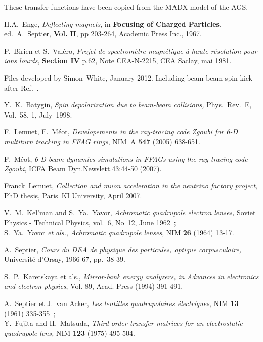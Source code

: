 \begin{thebibliography}{99}
 These transfer functions have been copied from the MADX model of the AGS.

H.A.~Enge, 
\textsl{Deflecting magnets}, in \textbf{Focusing of Charged Particles}, 
ed.~A.~Septier, \textbf{Vol.}  \textbf{II}, pp 203-264, Academic
Press Inc., 1967.

P.~Birien et S.~Val\'ero, 
\textsl{Projet de spectrom\`etre magn\'etique \`a haute r\'esolution pour ions lourds}, 
\textbf{Section IV} p.62, Note CEA-N-2215, CEA Saclay, mai 1981.


 Files developed by Simon~White, January 2012. Including beam-beam spin kick after Ref.~\cite{YKBatyginSpin}. 

Y.~K.~Batygin, 
\textsl{Spin depolarization due to beam-beam collisions, } 
Phys.~Rev.~E, Vol.~58,  1, July~1998. 

F.~Lemuet, F.~M\'eot, 
\textsl{Developements in the ray-tracing code Zgoubi for 6-D multiturn tracking in FFAG rings}, 
NIM~A \textbf{547} (2005) 638-651. 

 F.~M\'eot,  
\textsl{6-D beam dynamics simulations in FFAGs using the ray-tracing code Zgoubi}, 
ICFA Beam Dyn.Newslett.43:44-50 (2007).

Franck~Lemuet, 
\textsl{Collection and muon acceleration in the neutrino factory project}, 
PhD thesis, Paris~KI University, April 2007. 

V.~M.~Kel'man and S.~Ya.~Yavor, 
\textsl{Achromatic quadrupole electron lenses, } 
Soviet Physics - Technical Physics, vol.~6, No~12, June 1962~; \\
S.~Ya.~Yavor \textsl{et als.}, 
\textsl{Achromatic quadrupole lenses}, 
NIM \textbf{26} (1964) 13-17. 

A.~Septier, 
\textsl{Cours du DEA de physique des particules, optique corpusculaire,}  
Universit\'e d'Orsay, 1966-67, pp.~38-39.  

S.~P.~Karetskaya et als., 
\textsl{Mirror-bank energy analyzers, in Advances in electronics and electron physics}, 
Vol. 89, Acad. Press (1994) 391-491. 

A.~Septier et J.~van Acker, 
\textsl{Les lentilles quadrupolaires \'electriques}, 
NIM \textbf{13} (1961) 335-355~; \\
Y.~Fujita and H.~Matsuda, 
\textsl{Third order transfer matrices for an electrostatic quadrupole lens,} 
NIM \textbf{123} (1975) 495-504. 


\end{thebibliography}
